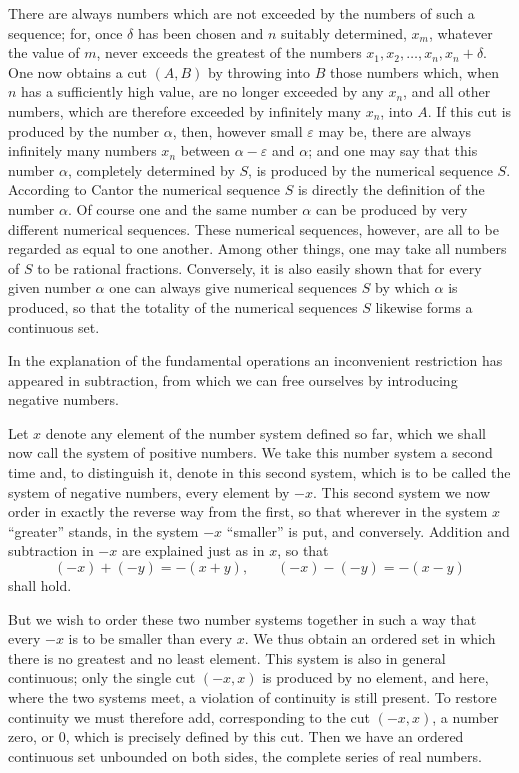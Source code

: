 \documentclass[11pt]{article}
\begin{document}
There are always numbers which are not exceeded by the numbers of such a sequence; for, once $\delta$ has been chosen and $n$ suitably determined, $x_m$, whatever the value of $m$, never exceeds the greatest of the numbers $x_1,x_2,\ldots,x_n,x_n+\delta$. One now obtains a cut $(A,B)$ by throwing into $B$ those numbers which, when $n$ has a sufficiently high value, are no longer exceeded by any $x_n$, and all other numbers, which are therefore exceeded by infinitely many $x_n$, into $A$. If this cut is produced by the number $\alpha$, then, however small $\varepsilon$ may be, there are always infinitely many numbers $x_n$ between $\alpha-\varepsilon$ and $\alpha$; and one may say that this number $\alpha$, completely determined by $S$, is produced by the numerical sequence $S$. According to Cantor the numerical sequence $S$ is directly the definition of the number $\alpha$. Of course one and the same number $\alpha$ can be produced by very different numerical sequences. These numerical sequences, however, are all to be regarded as equal to one another. Among other things, one may take all numbers of $S$ to be rational fractions. Conversely, it is also easily shown that for every given number $\alpha$ one can always give numerical sequences $S$ by which $\alpha$ is produced, so that the totality of the numerical sequences $S$ likewise forms a continuous set.

In the explanation of the fundamental operations an inconvenient restriction has appeared in subtraction, from which we can free ourselves by introducing negative numbers.

Let $x$ denote any element of the number system defined so far, which we shall now call the system of positive numbers. We take this number system a second time and, to distinguish it, denote in this second system, which is to be called the system of negative numbers, every element by $-x$. This second system we now order in exactly the reverse way from the first, so that wherever in the system $x$ ``greater'' stands, in the system $-x$ ``smaller'' is put, and conversely. Addition and subtraction in $-x$ are explained just as in $x$, so that
\[
 (-x)+(-y)=-(x+y),
 \qquad
 (-x)-(-y)=-(x-y)
\]
shall hold.

But we wish to order these two number systems together in such a way that every $-x$ is to be smaller than every $x$. We thus obtain an ordered set in which there is no greatest and no least element. This system is also in general continuous; only the single cut $(-x,x)$ is produced by no element, and here, where the two systems meet, a violation of continuity is still present. To restore continuity we must therefore add, corresponding to the cut $(-x,x)$, a number zero, or $0$, which is precisely defined by this cut. Then we have an ordered continuous set unbounded on both sides, the complete series of real numbers.
\end{document}
